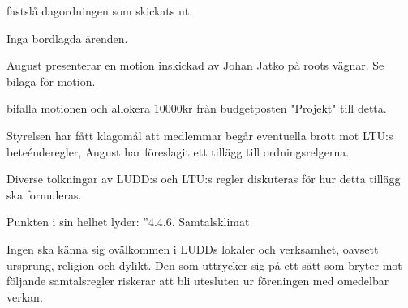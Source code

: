 \documentclass{protokoll}
\date{2019-02-17}  %
\begin{document}
\newpage  


\begin{beslut}
     \att fastslå dagordningen som skickats ut.
\end{beslut}

Inga bordlagda ärenden.

August presenterar en motion inskickad av Johan Jatko på roots vägnar. Se
bilaga för motion. 
\begin{beslut}
    \att bifalla motionen och allokera 10000kr från budgetposten "Projekt" till detta.
\end{beslut}

Styrelsen har fått klagomål att medlemmar begår eventuella brott mot LTU:s 
beteénderegler, August har föreslagit ett tillägg till ordningsrelgerna.  

Diverse tolkningar av LUDD:s och LTU:s regler diskuteras för hur detta tillägg
ska formuleras. 

Punkten i sin helhet lyder: 
''4.4.6. Samtalsklimat


Ingen ska känna sig ovälkommen i LUDDs lokaler och verksamhet, oavsett ursprung, religion och dylikt. Den som uttrycker sig på ett sätt som bryter mot följande samtalsregler riskerar att bli utesluten ur föreningen med omedelbar verkan.
\end{document}
